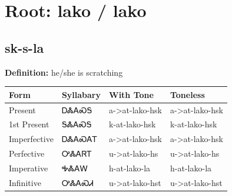 \documentclass{article}%
\begin{document}
%
\normalsize%
\section*{Root: lako / lako}%
\subsection*{sk-s-la}%
\textbf{Definition: }%
he/she is scratching%
\\[0.5em]%
\begin{tabular}{|l|l|l|l|}%
\hline%
\textbf{Form}&\textbf{Syllabary}&\textbf{With Tone}&\textbf{Toneless}\\%
\hline%
Present&ᎠᏜᎪᏍᎦ&a{-}>at{-}lako{-}hsk&a{-}>at{-}lako{-}hsk\\%
1st Present&ᎦᏜᎪᏍᎦ&k{-}at{-}lako{-}hsk&k{-}at{-}lako{-}hsk\\%
Imperfective&ᎠᏜᎪᏍᎪᎢ&a{-}>at{-}lako{-}hsk&a{-}>at{-}lako{-}hsk\\%
Perfective&ᎤᏜᎪᏒᎢ&u{-}>at{-}lako{-}hs&u{-}>at{-}lako{-}hs\\%
Imperative&ᎭᏜᎪᎳ&h{-}at{-}lako{-}la&h{-}at{-}lako{-}la\\%
Infinitive&ᎤᏜᎪᏍᏗ&u{-}>at{-}lako{-}hst&u{-}>at{-}lako{-}hst\\%
\hline%
\end{tabular}%
\\[1em]%
\end{document}
